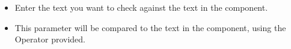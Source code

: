 
\begin{itemize}
\item Enter the text you want to check against the text in the component.
\item This parameter will be compared to the text in the component, using the Operator provided.
\end{itemize}
